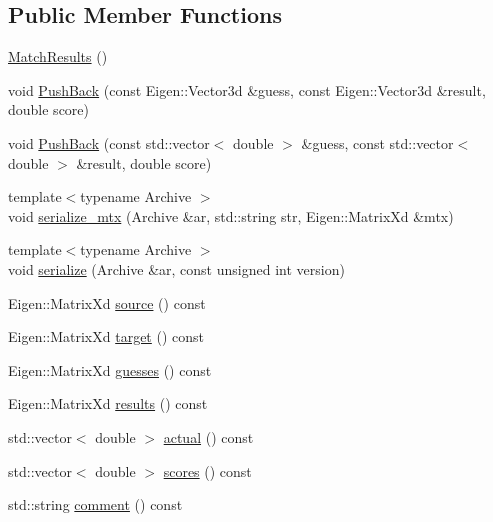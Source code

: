 \subsection*{Public Member Functions}
\begin{DoxyCompactItemize}
\item 
\hyperlink{classcommon_1_1MatchResults_a61b5ade3dc8c0f5ec8cc1a28d66316d9}{Match\+Results} ()
\item 
void \hyperlink{classcommon_1_1MatchResults_a3949bcd0e53bbce1c95bfa174033e6c4}{Push\+Back} (const Eigen\+::\+Vector3d \&guess, const Eigen\+::\+Vector3d \&result, double score)
\item 
void \hyperlink{classcommon_1_1MatchResults_a52646251d704b8f02f628f057ce678ac}{Push\+Back} (const std\+::vector$<$ double $>$ \&guess, const std\+::vector$<$ double $>$ \&result, double score)
\item 
{\footnotesize template$<$typename Archive $>$ }\\void \hyperlink{classcommon_1_1MatchResults_aaa028c2125c808d8ed6a399be6a4a30d}{serialize\+\_\+mtx} (Archive \&ar, std\+::string str, Eigen\+::\+Matrix\+Xd \&mtx)
\item 
{\footnotesize template$<$typename Archive $>$ }\\void \hyperlink{classcommon_1_1MatchResults_a47c29ca4386acfdfe204eee69a3d18fc}{serialize} (Archive \&ar, const unsigned int version)
\item 
Eigen\+::\+Matrix\+Xd \hyperlink{classcommon_1_1MatchResults_aee873ffecdcfb1c00c520326eb24d43e}{source} () const
\item 
Eigen\+::\+Matrix\+Xd \hyperlink{classcommon_1_1MatchResults_a4eccb30043877c55780aa935a404e8af}{target} () const
\item 
Eigen\+::\+Matrix\+Xd \hyperlink{classcommon_1_1MatchResults_a94ec129bf54fec917642b5b016bd345b}{guesses} () const
\item 
Eigen\+::\+Matrix\+Xd \hyperlink{classcommon_1_1MatchResults_a71899359d5ff15f8fc782969491eaad7}{results} () const
\item 
std\+::vector$<$ double $>$ \hyperlink{classcommon_1_1MatchResults_a51a4a0076719e2ab140cb223fc7f414c}{actual} () const
\item 
std\+::vector$<$ double $>$ \hyperlink{classcommon_1_1MatchResults_a33963f0089a5938ef58b9813d03a29f9}{scores} () const
\item 
std\+::string \hyperlink{classcommon_1_1MatchResults_a872852821e248926ff428de5e8bf24d6}{comment} () const
\item 

\end{DoxyCompactItemize}

